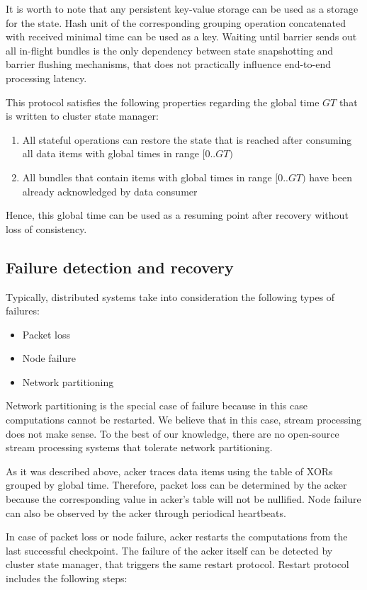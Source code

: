It is worth to note that any persistent key-value storage can be used as a storage for the state. Hash unit of the corresponding grouping operation concatenated with received minimal time can be used as a key. Waiting until barrier sends out all in-flight bundles is the only dependency between state snapshotting and barrier flushing mechanisms, that does not practically influence end-to-end processing latency. 

This protocol satisfies the following properties regarding the global time $GT$ that is written to cluster state manager:
\begin{enumerate}
    \item All stateful operations can restore the state that is reached after consuming all data items with global times in range $[0..GT)$ 
    \item All bundles that contain items with global times in range $[0..GT)$ have been already acknowledged by data consumer 
\end{enumerate}

Hence, this global time can be used as a resuming point after recovery without loss of consistency.

\subsection{Failure detection and recovery}
Typically, distributed systems take into consideration the following types of failures:
\begin{itemize}
    \item Packet loss
    \item Node failure
    \item Network partitioning
\end{itemize}

Network partitioning is the special case of failure because in this case computations cannot be restarted. We believe that in this case, stream processing does not make sense. To the best of our knowledge, there are no open-source stream processing systems that tolerate network partitioning.

As it was described above, acker traces data items using the table of XORs grouped by global time. Therefore, packet loss can be determined by the acker because the corresponding value in acker's table will not be nullified. Node failure can also be observed by the acker through periodical heartbeats. 

In case of packet loss or node failure, acker restarts the computations from the last successful checkpoint. The failure of the acker itself can be detected by cluster state manager, that triggers the same restart protocol. Restart protocol includes the following steps:

